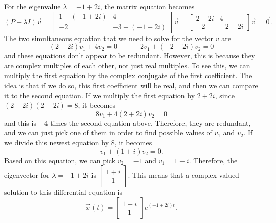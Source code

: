 \documentclass{ximera}
\begin{document}
\begin{exampleSol}
    For the eigenvalue $\lambda = -1 + 2i$, the matrix equation becomes
    \begin{equation*}
        (P - \lambda I)\vec{v} = 
        \begin{bmatrix} 
            1 - (-1 + 2i) & 4 \\ 
            -2 & -3 - (-1 + 2i) 
        \end{bmatrix} 
        \vec{v} = 
        \begin{bmatrix} 
            2 - 2i & 4 \\ 
            -2 & -2 -2i 
        \end{bmatrix}
        \vec{v} = \vec{0}. 
    \end{equation*}
    The two simultaneous equation that we need to solve for the vector $v$ are 
    \begin{equation*}
        (2-2i)v_1 + 4v_2 = 0 \qquad -2v_1 + (-2-2i)v_2 = 0
    \end{equation*}
    and these equations don't appear to be redundant. However, this is because they are complex multiples of each other, not just real multiples. To see this, we can multiply the first equation by the complex conjugate of the first coefficient. The idea is that if we do so, this first coefficient will be real, and then we can compare it to the second equation. If we multiply the first equation by $2 + 2i$, since $(2+2i)(2-2i) = 8$, it becomes
    \begin{equation*}
        8v_1 + 4(2+2i)v_2 = 0
    \end{equation*}
    and this is $-4$ times the second equation above. Therefore, they are redundant, and we can just pick one of them in order to find possible values of $v_1$ and $v_2$. If we divide this newest equation by $8$, it becomes
    \begin{equation*}
        v_1 + (1+i)v_2 = 0.
    \end{equation*}
    Based on this equation, we can pick $v_2 = -1$ and $v_1 = 1+i$. Therefore, the eigenvector for $\lambda = -1 + 2i$ is $\left[ \begin{smallmatrix} 1+i \\ -1 \end{smallmatrix} \right]$. This means that a complex-valued solution to this differential equation is
    \begin{equation*}
        \vec{x}(t) = 
        \begin{bmatrix} 
            1+i \\ 
            -1 
        \end{bmatrix} 
        e^{(-1 + 2i)t}.
    \end{equation*}
    

\end{exampleSol}
\end{document}
